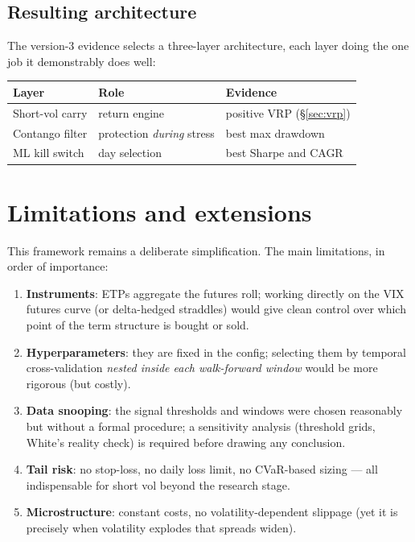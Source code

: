 \documentclass[11pt,a4paper]{article}
\begin{document}
\subsection{Resulting architecture}

The version-3 evidence selects a three-layer architecture, each layer doing
the one job it demonstrably does well:
\begin{center}
\begin{tabular}{lll}
\toprule
\textbf{Layer} & \textbf{Role} & \textbf{Evidence} \\
\midrule
Short-vol carry & return engine & positive VRP (\S\ref{sec:vrp}) \\
Contango filter & protection \emph{during} stress & best max drawdown \\
ML kill switch & day selection & best Sharpe and CAGR \\
\bottomrule
\end{tabular}
\end{center}

\section{Limitations and extensions}

This framework remains a deliberate simplification. The main limitations, in
order of importance:
\begin{enumerate}
\item \textbf{Instruments}: ETPs aggregate the futures roll; working directly
  on the VIX futures curve (or delta-hedged straddles) would give clean
  control over which point of the term structure is bought or sold.
\item \textbf{Hyperparameters}: they are fixed in the config; selecting them
  by temporal cross-validation \emph{nested inside each walk-forward window}
  would be more rigorous (but costly).
\item \textbf{Data snooping}: the signal thresholds and windows were chosen
  reasonably but without a formal procedure; a sensitivity analysis
  (threshold grids, White's reality check) is required before drawing any
  conclusion.
\item \textbf{Tail risk}: no stop-loss, no daily loss limit, no CVaR-based
  sizing --- all indispensable for short vol beyond the research stage.
\item \textbf{Microstructure}: constant costs, no volatility-dependent
  slippage (yet it is precisely when volatility explodes that spreads
  widen).
\end{enumerate}
\end{document}
